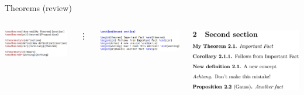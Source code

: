 \documentclass[11pt]{beamer}
\begin{document}
\begin{frame}{Theorems (review)}
  \begin{columns}
      \includegraphics[scale=0.3]{img/thm_pre.png}

      \vspace{0.2cm}
      \vdots
      \vspace{0.3cm}

      \includegraphics[scale=0.3]{img/thm_tex.png}

      \includegraphics[scale=0.2]{img/thm_pdf.png}

      \vspace{1cm}
  \end{columns}
\end{frame}
\end{document}
